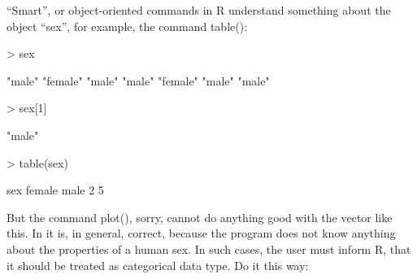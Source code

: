 \documentclass[a4paper,11pt]{scrartcl}
\begin{document}
“Smart”, or object-oriented commands in R understand something about the object “sex”, for example, the command table():

\begin{Schunk}
\begin{Sinput}
> sex
\end{Sinput}
\begin{Soutput}
[1] "male"   "female" "male"   "male"   "female" "male"   "male"  
\end{Soutput}
\begin{Sinput}
> sex[1]
\end{Sinput}
\begin{Soutput}
[1] "male"
\end{Soutput}
\begin{Sinput}
> table(sex)
\end{Sinput}
\begin{Soutput}
sex
female   male 
     2      5 
\end{Soutput}
\end{Schunk}

But the command plot(), sorry, cannot do anything good with the vector like this. In it is, in general, correct, because the program does not know anything about the properties of a human sex. In such cases, the user must inform R, that it should be treated as categorical data type. 
Do it this way:

\end{document}
